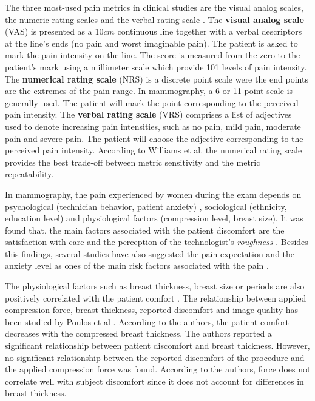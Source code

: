 The three most-used pain metrics in clinical studies are the visual analog scales, the numeric rating scales and the verbal rating scale \citep{williamson_pain_2005}. The \textbf{visual analog scale} (VAS) is presented as a 10$cm$ continuous line together with a verbal descriptors at the line's ends (no pain and worst imaginable pain). The patient is asked to mark the pain intensity on the line. The score is measured from the zero to the patient's mark using a millimeter scale which provide 101 levels of pain intensity. The \textbf{numerical rating scale} (NRS) is a discrete point scale were the end points are the extremes of the pain range. In mammography, a 6 or 11 point scale is generally used.  The patient will mark the point corresponding to the perceived pain intensity. The \textbf{verbal rating scale} (VRS) comprises a list of adjectives used to denote increasing pain intensities, such as no pain, mild pain, moderate pain and severe pain. The patient will choose the adjective corresponding to the perceived pain intensity. According to Williams et al. \citep{williamson_pain_2005} the numerical rating scale provides the best trade-off between metric sensitivity and the metric repeatability.     

In mammography, the pain experienced by women during the exam depends on psychological (technician behavior, patient anxiety) \citep{aro_pain_1996}, sociological  (ethnicity, education level) \citep{dullum_rates_2000} and physiological factors (compression level, breast size)\citep{poulos_breast_2003}.  It was found that, the main factors associated with the patient discomfort are the satisfaction with care and the perception of the technologist's \textit{roughness} \cite{dullum_rates_2000}. Besides this findings, several studies have also suggested the pain expectation and the anxiety level as ones of the main risk factors associated with the pain \citep{aro_pain_1996,williamson_pain_2005,keemers_pain_2000,askhar_female_2017}.   

The physiological factors such as breast thickness, breast size or periods are also positively correlated with the patient comfort \citep{keemers_pain_2000,hafslund_mammography_2000}. The relationship between applied compression force, breast thickness, reported discomfort and image quality has been studied by Poulos et al \citep{poulos_breast_2003}. According to the authors, the patient comfort decreases with the compressed breast thickness. The authors reported a significant relationship between patient discomfort and breast thickness. However, no significant relationship between the reported discomfort of the procedure and the applied compression force was found. According to the authors, force does not correlate well with subject discomfort since it does not account for differences in breast thickness.
 
